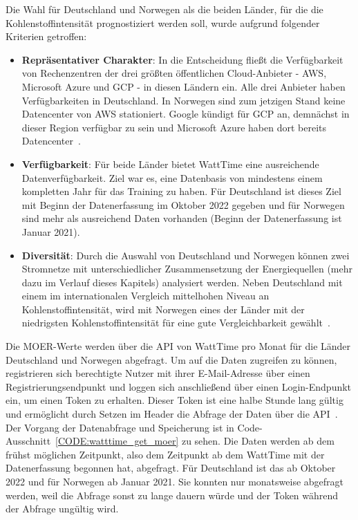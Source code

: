 Die Wahl für Deutschland und Norwegen als die beiden Länder, für die die Kohlenstoffintensität prognostiziert werden soll, wurde aufgrund folgender Kriterien getroffen:
\begin{itemize}
 \item \textbf{Repräsentativer Charakter}: In die Entscheidung fließt die Verfügbarkeit von Rechenzentren der drei größten öffentlichen Cloud-Anbieter - \ac{AWS}, Microsoft Azure und \ac{GCP} - in diesen Ländern ein.
 Alle drei Anbieter haben Verfügbarkeiten in Deutschland.
 In Norwegen sind zum jetzigen Stand keine Datencenter von \ac{AWS} stationiert.
 Google kündigt für \ac{GCP} an, demnächst in dieser Region verfügbar zu sein und Microsoft Azure haben dort bereits Datencenter~\cite{AmazonWebServices.20240318T18:30:19.000Z}\cite{GoogleCloud.20240311T07:04:17.000Z}\cite{Microsoft.20240307T01:34:37.000Z}.
 \item \textbf{Verfügbarkeit}: Für beide Länder bietet WattTime eine ausreichende Datenverfügbarkeit.
 Ziel war es, eine Datenbasis von mindestens einem kompletten Jahr für das Training zu haben.
 Für Deutschland ist dieses Ziel mit Beginn der Datenerfassung im Oktober 2022 gegeben und für Norwegen sind mehr als ausreichend Daten vorhanden (Beginn der Datenerfassung ist Januar 2021).
 \item \textbf{Diversität}: Durch die Auswahl von Deutschland und Norwegen können zwei Stromnetze mit unterschiedlicher Zusammensetzung der Energiequellen (mehr dazu im Verlauf dieses Kapitels) analysiert werden.
 Neben Deutschland mit einem im internationalen Vergleich mittelhohen Niveau an Kohlenstoffintensität, wird mit Norwegen eines der Länder mit der niedrigsten Kohlenstoffintensität für eine gute Vergleichbarkeit gewählt~\cite{ElectricityMaps.20240305T20:54:29.000Z}.
\end{itemize}
Die \ac{MOER}-Werte werden über die \ac{API} von WattTime pro Monat für die Länder Deutschland und Norwegen abgefragt.
Um auf die Daten zugreifen zu können, registrieren sich berechtigte Nutzer mit ihrer E-Mail-Adresse über einen Registrierungsendpunkt und loggen sich anschließend über einen Login-Endpunkt ein, um einen Token zu erhalten.
Dieser Token ist eine halbe Stunde lang gültig und ermöglicht durch Setzen im Header die Abfrage der Daten über die \ac{API}~\cite{.20240220T17:59:19.000Z}.
Der Vorgang der Datenabfrage und Speicherung ist in Code-Ausschnitt~\ref{CODE:watttime_get_moer} zu sehen.
Die Daten werden ab dem frühst möglichen Zeitpunkt, also dem Zeitpunkt ab dem WattTime mit der Datenerfassung begonnen hat, abgefragt.
Für Deutschland ist das ab Oktober 2022 und für Norwegen ab Januar 2021.
Sie konnten nur monatsweise abgefragt werden, weil die Abfrage sonst zu lange dauern würde und der Token während der Abfrage ungültig wird.

